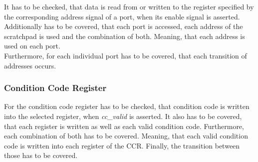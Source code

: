 It has to be checked, that data is read from or written to the register specified by the corresponding address signal of a port, when its enable signal is
asserted.
Additionally has to be covered, that each port is accessed, each address of the scratchpad is used and the combination of both.
Meaning, that each address is used on each port.\\
Furthermore, for each individual port has to be covered, that each transition of addresses occurs.


\subsubsection{Condition Code Register}

For the condition code register has to be checked, that condition code is written into the selected register, when \emph{cc\_valid} is asserted.
It also has to be covered, that each register is written as well as each valid condition code.
Furthermore, each combination of both has to be covered. Meaning, that each valid condition code is written into each register of the CCR.
Finally, the transition between those has to be covered.